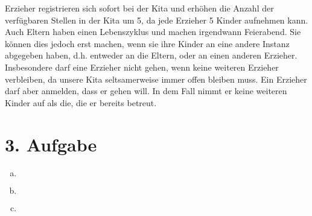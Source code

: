 \documentclass[numbers=noendperiod]{scrartcl}
\begin{document}
Erzieher registrieren sich sofort bei der Kita und erhöhen die Anzahl der verfügbaren Stellen in der Kita um 5, da jede Erzieher 5 Kinder aufnehmen kann. Auch Eltern haben einen Lebenszyklus und machen irgendwann Feierabend. Sie können dies jedoch erst machen, wenn sie ihre Kinder an eine andere Instanz abgegeben haben, d.h. entweder an die Eltern, oder an einen anderen Erzieher. Insbesondere darf eine Erzieher nicht gehen, wenn keine weiteren Erzieher verbleiben, da unsere Kita seltsamerweise immer offen bleiben muss. Ein Erzieher darf aber anmelden, dass er gehen will. In dem Fall nimmt er keine weiteren Kinder auf als die, die er bereits betreut.





\section*{3. Aufgabe}

\begin{enumerate}[a)]
	\item ${}$\\
	
	
	
	
	\item ${}$\\
	
	
	\item ${}$\\
	
	
\end{enumerate}
\end{document}
